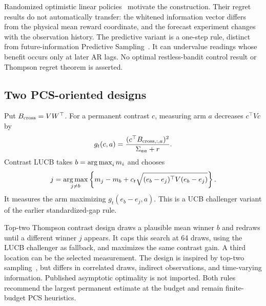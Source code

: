 Randomized optimistic linear policies~\cite{abeille2017} motivate the construction. Their regret results do not automatically transfer: the whitened information vector differs from the physical mean reward coordinate, and the forecast experiment changes with the observation history. The predictive variant is a one-step rule, distinct from future-information Predictive Sampling~\cite{liu2023}. It can undervalue readings whose benefit occurs only at later AR lags. No optimal restless-bandit control result or Thompson regret theorem is asserted.

\subsection{Two PCS-oriented designs}
Put $B_{\rm cross}=VW^\top$. For a permanent contrast $c$, measuring arm $a$ decreases $c^\top Vc$ by
\begin{equation}
g_t(c,a)=\frac{(c^\top B_{{\rm cross},:,a})^2}{\Sigma_{aa}+r}.
\end{equation}
Contrast LUCB takes $b=\operatorname*{arg\,max}_i m_i$ and chooses
\[
j=\operatorname*{arg\,max}_{j\ne b}\left\{m_j-m_b+c_t\sqrt{(e_b-e_j)^\top V(e_b-e_j)}\right\}.
\]
It measures the arm maximizing $g_t(e_b-e_j,a)$. This is a UCB challenger variant of the earlier standardized-gap rule.

Top-two Thompson contrast design draws a plausible mean winner $b$ and redraws until a different winner $j$ appears. It caps this search at 64 draws, using the LUCB challenger as fallback, and maximizes the same contrast gain. A third location can be the selected measurement. The design is inspired by top-two sampling~\cite{russo2016}, but differs in correlated draws, indirect observations, and time-varying information. Published asymptotic optimality is not imported. Both rules recommend the largest permanent estimate at the budget and remain finite-budget PCS heuristics.
